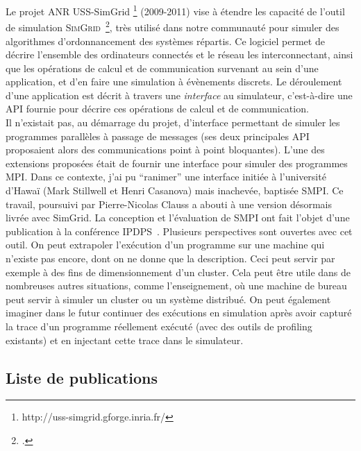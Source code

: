 \documentclass[11pt]{article}
\begin{document}
Le projet ANR USS-SimGrid%
\footnote{http://uss-simgrid.gforge.inria.fr/} (2009-2011) vise à étendre les 
capacité de l'outil de simulation \textsc{SimGrid}~\footcite{Casanova08}, très 
utilisé dans notre communauté pour simuler des algorithmes d'ordonnancement des
systèmes répartis. Ce logiciel permet de décrire l'ensemble des ordinateurs
connectés et le réseau les interconnectant, ainsi que les opérations de calcul
et de communication survenant au sein d'une application, et d'en faire une 
simulation à évènements discrets. Le déroulement d'une application est décrit à 
travers une \emph{interface} au simulateur, c'est-à-dire une API fournie pour 
décrire ces opérations de calcul et de communication.\\

Il n'existait pas, au démarrage du projet, d'interface permettant de simuler les 
programmes parallèles à passage de messages (ses deux principales API proposaient 
alors des communications point à point bloquantes). L'une des extensions proposées 
était de fournir une interface pour simuler des programmes MPI. Dans ce contexte, 
j'ai pu ``ranimer'' une interface initiée à l'université d'Hawaï (Mark Stillwell et
Henri Casanova) mais inachevée, baptisée SMPI. Ce travail, poursuivi par 
Pierre-Nicolas Clauss a abouti à une version désormais 
livrée avec SimGrid. La conception et l'évaluation de SMPI ont fait l'objet d'une 
publication à la conférence IPDPS~\cite{icps-2011-224}.
Plusieurs perspectives sont ouvertes avec cet outil. On peut extrapoler l'exécution
d'un programme sur une machine qui n'existe pas encore, dont on ne donne que la 
description. Ceci peut servir par exemple à des fins de dimensionnement d'un cluster.
Cela peut être utile dans de nombreuses autres situations, comme 
l'enseignement, où une machine de bureau peut servir à simuler un cluster
ou un système distribué. On peut également imaginer dans le futur continuer des 
exécutions en simulation après avoir capturé la trace d'un programme réellement 
exécuté (avec des outils de profiling existants) et en injectant cette trace dans 
le simulateur.


\newpage

\subsection{Liste de publications}
\end{document}
